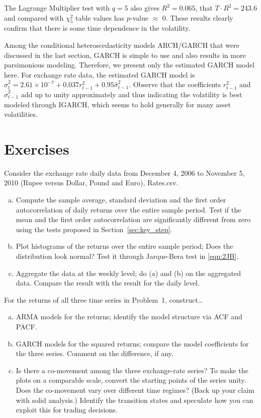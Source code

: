 The Lagrange Multiplier test with $q=5$ also gives $R^2= 0.065$, that $T \cdot R^2 = 243.6$ and compared with $\chi_5^2$ table values has $p$-value $\approx$ 0. These results clearly confirm that there is some time dependence in the volatility.


Among the conditional heteroscedasticity models ARCH/GARCH that were discussed in the last section, GARCH is simple to use and also results in more parsimonious modeling. Therefore, we present only the estimated GARCH model here. For exchange rate data, the estimated GARCH model is $\hat{\sigma}_t^2 = 2.61 \times 10^{-7} + 0.037r_{t-1}^2 + 0.95\hat{\sigma}_{t-1}^2$. Observe that the coefficients $r_{t-1}^2$ and $\hat{\sigma}_{t-1}^2$ add up to unity approximately and thus indicating the volatility is best modeled through IGARCH, which seems to hold generally for many asset volatilities.



\section{Exercises\label{sec:three_exercise}}


\prob Consider the exchange rate daily data from December 4, 2006 to November 5, 2010 (Rupee versus Dollar, Pound and Euro), Rates.csv.

\begin{enumerate}[(a)]
\item Compute the sample average, standard deviation and the first order autocorrelation of daily returns over the entire sample period.  Test if the mean and the first order autocorrelation are significantly different from zero using the tests proposed in Section~\ref{sec:key_step}. 
\item Plot histograms of the returns over the entire sample period; Does the distribution look normal?  Test it through Jarque-Bera test in \eqref{eqn:2JB}.
\item Aggregate the data at the weekly level; do (a) and (b) on the aggregated data. Compare the result with the result for the daily level. \twomedskip
\end{enumerate}


\prob For the returns of all three time series in Problem~1,  construct\dots

\begin{enumerate}[(a)]
\item ARMA models for the returns; identify the model structure via ACF and PACF.
\item  GARCH models for the squared returns; compare the model coefficients for the three series.  Comment on the difference, if any.
\item Is there a co-movement among the three exchange-rate series? To make the plots on a comparable scale, convert the starting points of the series unity. Does the co-movement vary over different time regimes? (Back up your claim with solid analysis.) Identify the transition states and speculate how you can exploit this for trading decisions. \twomedskip
\end{enumerate}


